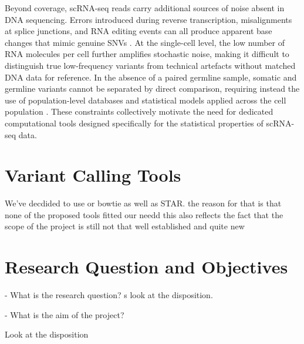 Beyond coverage, scRNA-seq reads carry additional sources of noise absent in DNA sequencing. 
Errors introduced during reverse transcription, misalignments at splice junctions, and RNA editing events can all produce apparent base changes that mimic genuine SNVs \parencite{MuyasDenovodetection2024,MarotIdentifyingcancer2024}. 
At the single-cell level, the low number of RNA molecules per cell further amplifies stochastic noise, making it difficult to distinguish true low-frequency variants from technical artefacts without matched DNA data for reference. 
In the absence of a paired germline sample, somatic and germline variants cannot be separated by direct comparison, requiring instead the use of population-level databases and statistical models applied across the cell population \parencite{Xureviewsomatic2018,MuyasDenovodetection2024}. 
These constraints collectively motivate the need for dedicated computational tools designed specifically for the statistical properties of scRNA-seq data.


\section{Variant Calling Tools}


We've decdided to use or bowtie as well as STAR. the reason for that is that none of the proposed tools fitted our needd this also reflects the fact that the scope of the project is still not that well established and quite new
\section{Research Question and Objectives }
- What is the research question?
s
look at the disposition.


- What is the aim of the project?

Look at the disposition 

